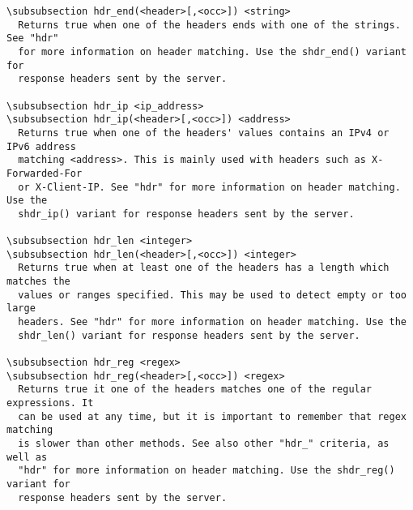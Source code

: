 \begin{verbatim}
\subsubsection hdr_end(<header>[,<occ>]) <string>
  Returns true when one of the headers ends with one of the strings. See "hdr"
  for more information on header matching. Use the shdr_end() variant for
  response headers sent by the server.

\subsubsection hdr_ip <ip_address>
\subsubsection hdr_ip(<header>[,<occ>]) <address>
  Returns true when one of the headers' values contains an IPv4 or IPv6 address
  matching <address>. This is mainly used with headers such as X-Forwarded-For
  or X-Client-IP. See "hdr" for more information on header matching. Use the
  shdr_ip() variant for response headers sent by the server.

\subsubsection hdr_len <integer>
\subsubsection hdr_len(<header>[,<occ>]) <integer>
  Returns true when at least one of the headers has a length which matches the
  values or ranges specified. This may be used to detect empty or too large
  headers. See "hdr" for more information on header matching. Use the
  shdr_len() variant for response headers sent by the server.

\subsubsection hdr_reg <regex>
\subsubsection hdr_reg(<header>[,<occ>]) <regex>
  Returns true it one of the headers matches one of the regular expressions. It
  can be used at any time, but it is important to remember that regex matching
  is slower than other methods. See also other "hdr_" criteria, as well as
  "hdr" for more information on header matching. Use the shdr_reg() variant for
  response headers sent by the server.


\end{verbatim}
